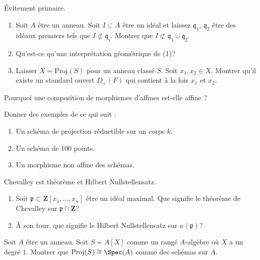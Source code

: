 \begin{exercise}
\label{exercise-prime-avoidance}
Évitement primaire.
\begin{enumerate}
\item Soit $A$ être un anneau. Soit $I \subset A$ être
un idéal et laissez $\mathfrak q_1$, $\mathfrak q_2$ être des idéaux premiers
tels que $I \not \subset \mathfrak q_i$. Montrer
que $I \not \subset \mathfrak q_1 \cup \mathfrak q_2$.
\item Qu'est-ce qu'une interprétation géométrique de (1)?
\item Laisser $X = \text{Proj}(S)$ pour un anneau classé $S$.
Soit $x_1, x_2 \in X$. Montrer qu'il existe un standard ouvert
$D_{+}(F)$ qui contient à la fois $x_1$ et $x_2$.
\end{enumerate}
\end{exercise}

\begin{exercise}
\label{exercise-compose-affine}
Pourquoi une composition de morphismes d'affines est-elle affine ?
\end{exercise}

\begin{exercise}[Examples]
\label{exercise-examples}
Donner des exemples de ce qui suit :
\begin{enumerate}
\item Un schéma de projection réductible sur un corps $k$.
\item Un schéma de 100 points.
\item Un morphisme non affine des schémas.
\end{enumerate}
\end{exercise}

\begin{exercise}
\label{exercise-chevalley-hilbert-nullstellensatz}
Chevalley est théorème et Hilbert Nullstellensatz.
\begin{enumerate}
\item Soit $\mathfrak p \subset \mathbf{Z}[x_1, \ldots, x_n]$ être
un idéal maximal. Que signifie le théorème de Chevalley
sur $\mathfrak p \cap \mathbf{Z}$?
\item À son tour, que signifie le Hilbert Nullstellensatz
sur $\kappa(\mathfrak p)$?
\end{enumerate}
\end{exercise}

\begin{exercise}
\label{exercise-P0}
Soit $A$ être un anneau. Soit $S = A[X]$ comme un
rangé $A$-algèbre où $X$ a un degré $1$. Montrer que $\text{Proj}(S) \cong \Spec(A)$ comme
des schémas sur $A$.
\end{exercise}

